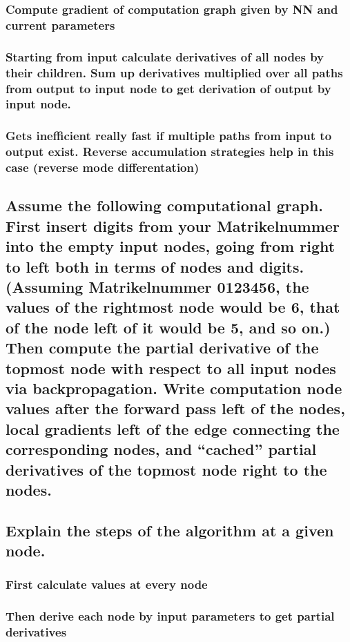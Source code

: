 \subsubsection{ Compute gradient of computation graph given by NN and current parameters}

\subsubsection{ Starting from input calculate derivatives of all nodes by their children. Sum up derivatives multiplied over all paths from output to input node to get derivation of output by input node. }

\subsubsection{ Gets inefficient really fast if multiple paths from input to output exist. Reverse accumulation strategies help in this case (reverse mode differentation)}

\subsection{Assume the following computational graph. First insert digits from your Matrikelnummer into the empty input nodes, going from right to left both in terms of nodes and digits. (Assuming Matrikelnummer 0123456, the values of the rightmost node would be 6, that of the node left of it would be 5, and so on.) Then compute the partial derivative of the topmost node with respect to all input nodes via  backpropagation. Write computation node values after the forward pass left of the nodes, local gradients left of the edge connecting the corresponding nodes, and “cached” partial derivatives of the topmost node right to the nodes.}

\subsection{Explain the steps of the algorithm at a given node.}

\subsubsection{ First calculate values at every node}

\subsubsection{ Then derive each node by input parameters to get partial derivatives}

